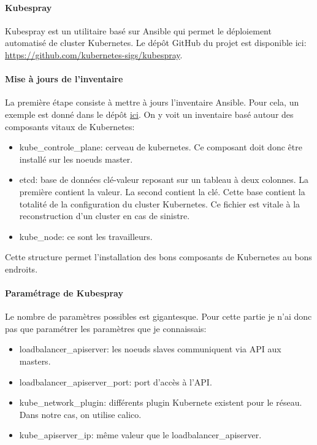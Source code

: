 \documentclass[12pt]{article}
\begin{document}
\paragraph{Kubespray}
Kubespray est un utilitaire basé sur Ansible qui permet le déploiement automatisé de cluster Kubernetes.
Le dépôt GitHub du projet est disponible ici: \\ \url{https://github.com/kubernetes-sigs/kubespray}.

\paragraph{Mise à jours de l'inventaire}
La première étape consiste à mettre à jours l'inventaire Ansible.
Pour cela, un exemple est donné dans le dépôt \href{https://github.com/kubernetes-sigs/kubespray/blob/master/inventory/sample/inventory.ini}{ici}.
On y voit un inventaire basé autour des composants vitaux de Kubernetes:
\begin{itemize}
    \item kube\_controle\_plane: cerveau de kubernetes.
    Ce composant doit donc être installé sur les noeuds master.
    \item etcd: base de données clé-valeur reposant sur un tableau à deux colonnes.
    La première contient la valeur.
    La second contient la clé.
    Cette base contient la totalité de la configuration du cluster Kubernetes.
    Ce fichier est vitale à la reconstruction d'un cluster en cas de sinistre.
    \item kube\_node: ce sont les travailleurs.
\end{itemize}

Cette structure permet l'installation des bons composants de Kubernetes au bons endroits.

\paragraph{Paramétrage de Kubespray}
Le nombre de paramètres possibles est gigantesque.
Pour cette partie je n'ai donc pas que paramétrer les paramètres que je connaissais:
\begin{itemize}
    \item loadbalancer\_apiserver: les noeuds slaves communiquent via API aux masters.
    \item loadbalancer\_apiserver\_port: port d'accès à l'API.
    \item kube\_network\_plugin: différents plugin Kubernete existent pour le réseau.
    Dans notre cas, on utilise calico.
    \item kube\_apiserver\_ip: même valeur que le loadbalancer\_apiserver.
\end{itemize}
\end{document}
